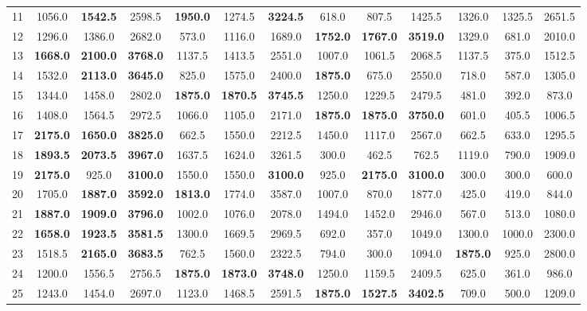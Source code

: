 \documentclass[conference]{IEEEtran}
\begin{document}
\begin{table}[!t]
\begin{tabular}{r ccc ccc ccc ccc}
11 & 1056.0 & \textbf{1542.5} & 2598.5 & \textbf{1950.0} & 1274.5 & \textbf{3224.5} & 618.0 & 807.5 & 1425.5 & 1326.0 & 1325.5 & 2651.5 \\
12 & 1296.0 & 1386.0 & 2682.0 & 573.0 & 1116.0 & 1689.0 & \textbf{1752.0} & \textbf{1767.0} & \textbf{3519.0} & 1329.0 & 681.0 & 2010.0 \\
13 & \textbf{1668.0} & \textbf{2100.0} & \textbf{3768.0} & 1137.5 & 1413.5 & 2551.0 & 1007.0 & 1061.5 & 2068.5 & 1137.5 & 375.0 & 1512.5 \\
14 & 1532.0 & \textbf{2113.0} & \textbf{3645.0} & 825.0 & 1575.0 & 2400.0 & \textbf{1875.0} & 675.0 & 2550.0 & 718.0 & 587.0 & 1305.0 \\
15 & 1344.0 & 1458.0 & 2802.0 & \textbf{1875.0} & \textbf{1870.5} & \textbf{3745.5} & 1250.0 & 1229.5 & 2479.5 & 481.0 & 392.0 & 873.0 \\
16 & 1408.0 & 1564.5 & 2972.5 & 1066.0 & 1105.0 & 2171.0 & \textbf{1875.0} & \textbf{1875.0} & \textbf{3750.0} & 601.0 & 405.5 & 1006.5 \\
17 & \textbf{2175.0} & \textbf{1650.0} & \textbf{3825.0} & 662.5 & 1550.0 & 2212.5 & 1450.0 & 1117.0 & 2567.0 & 662.5 & 633.0 & 1295.5 \\
18 & \textbf{1893.5} & \textbf{2073.5} & \textbf{3967.0} & 1637.5 & 1624.0 & 3261.5 & 300.0 & 462.5 & 762.5 & 1119.0 & 790.0 & 1909.0 \\
19 & \textbf{2175.0} & 925.0 & \textbf{3100.0} & 1550.0 & 1550.0 & \textbf{3100.0} & 925.0 & \textbf{2175.0} & \textbf{3100.0} & 300.0 & 300.0 & 600.0 \\
20 & 1705.0 & \textbf{1887.0} & \textbf{3592.0} & \textbf{1813.0} & 1774.0 & 3587.0 & 1007.0 & 870.0 & 1877.0 & 425.0 & 419.0 & 844.0 \\
21 & \textbf{1887.0} & \textbf{1909.0} & \textbf{3796.0} & 1002.0 & 1076.0 & 2078.0 & 1494.0 & 1452.0 & 2946.0 & 567.0 & 513.0 & 1080.0 \\
22 & \textbf{1658.0} & \textbf{1923.5} & \textbf{3581.5} & 1300.0 & 1669.5 & 2969.5 & 692.0 & 357.0 & 1049.0 & 1300.0 & 1000.0 & 2300.0 \\
23 & 1518.5 & \textbf{2165.0} & \textbf{3683.5} & 762.5 & 1560.0 & 2322.5 & 794.0 & 300.0 & 1094.0 & \textbf{1875.0} & 925.0 & 2800.0 \\
24 & 1200.0 & 1556.5 & 2756.5 & \textbf{1875.0} & \textbf{1873.0} & \textbf{3748.0} & 1250.0 & 1159.5 & 2409.5 & 625.0 & 361.0 & 986.0 \\
25 & 1243.0 & 1454.0 & 2697.0 & 1123.0 & 1468.5 & 2591.5 & \textbf{1875.0} & \textbf{1527.5} & \textbf{3402.5} & 709.0 & 500.0 & 1209.0 \\

\end{tabular}
\end{table}
\end{document}
